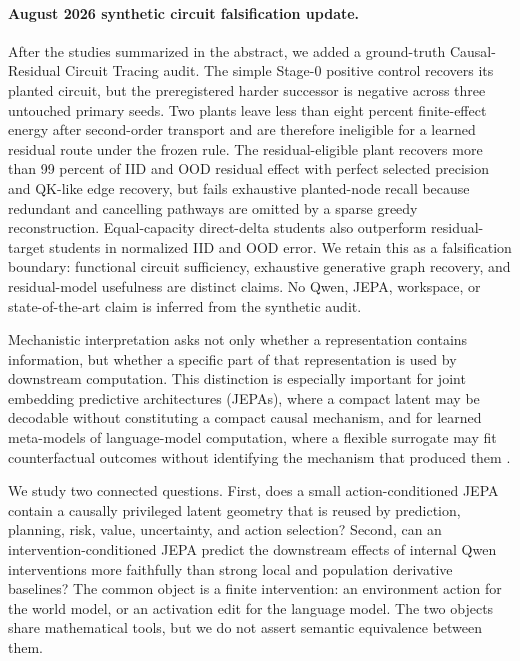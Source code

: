 \documentclass[10pt]{article}
\begin{document}
\paragraph{August 2026 synthetic circuit falsification update.}
After the studies summarized in the abstract, we added a ground-truth
Causal-Residual Circuit Tracing audit.  The simple Stage-0 positive control
recovers its planted circuit, but the preregistered harder successor is negative
across three untouched primary seeds.  Two plants leave less than eight percent
finite-effect energy after second-order transport and are therefore ineligible
for a learned residual route under the frozen rule.  The residual-eligible plant
recovers more than 99 percent of IID and OOD residual effect with perfect
selected precision and QK-like edge recovery, but fails exhaustive planted-node
recall because redundant and cancelling pathways are omitted by a sparse greedy
reconstruction.  Equal-capacity direct-delta students also outperform
residual-target students in normalized IID and OOD error.  We retain this as a
falsification boundary: functional circuit sufficiency, exhaustive generative
graph recovery, and residual-model usefulness are distinct claims.  No Qwen,
JEPA, workspace, or state-of-the-art claim is inferred from the synthetic audit.

Mechanistic interpretation asks not only whether a representation contains
information, but whether a specific part of that representation is used by
downstream computation.  This distinction is especially important for joint
embedding predictive architectures (JEPAs), where a compact latent may be
decodable without constituting a compact causal mechanism, and for learned
meta-models of language-model computation, where a flexible surrogate may fit
counterfactual outcomes without identifying the mechanism that produced them
\cite{sutter2025nonlinear}.

We study two connected questions.  First, does a small action-conditioned JEPA
contain a causally privileged latent geometry that is reused by prediction,
planning, risk, value, uncertainty, and action selection?  Second, can an
intervention-conditioned JEPA predict the downstream effects of internal Qwen
interventions more faithfully than strong local and population derivative
baselines?  The common object is a finite intervention: an environment action
for the world model, or an activation edit for the language model.  The two
objects share mathematical tools, but we do not assert semantic equivalence
between them.
\end{document}
